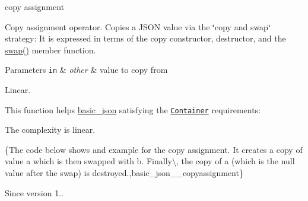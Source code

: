 copy assignment 

Copy assignment operator. Copies a J\+S\+ON value via the \char`\"{}copy and swap\char`\"{} strategy\+: It is expressed in terms of the copy constructor, destructor, and the \hyperlink{classnlohmann_1_1basic__json_a2f774129440c427253dc97406e2d9010}{swap()} member function.


\begin{DoxyParams}[1]{Parameters}
\mbox{\tt in}  & {\em other} & value to copy from\\
\hline
\end{DoxyParams}
Linear.

This function helps {\ttfamily \hyperlink{classnlohmann_1_1basic__json}{basic\+\_\+json}} satisfying the \href{http://en.cppreference.com/w/cpp/concept/Container}{\tt Container} requirements\+:
\begin{DoxyItemize}
\item The complexity is linear.
\end{DoxyItemize}

\{The code below shows and example for the copy assignment. It creates a copy of value {\ttfamily a} which is then swapped with {\ttfamily b}. Finally\textbackslash{}, the copy of {\ttfamily a} (which is the null value after the swap) is destroyed.,basic\+\_\+json\+\_\+\+\_\+copyassignment\}

\begin{DoxySince}{Since}
version 1.. 
\end{DoxySince}
\hypertarget{classnlohmann_1_1basic__json_a59732a1de287a7301cca19a7a7748159}{}\label{classnlohmann_1_1basic__json_a59732a1de287a7301cca19a7a7748159} 
